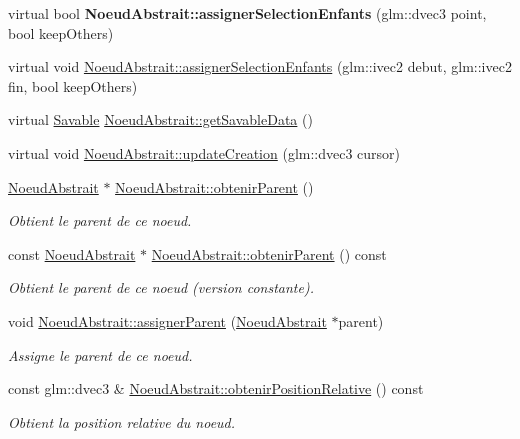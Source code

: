 \begin{DoxyCompactItemize}
\item 
\hypertarget{group__inf2990_ga4214cc2ab8bb23ab67c10387d7d1ef5e}{}virtual bool {\bfseries Noeud\+Abstrait\+::assigner\+Selection\+Enfants} (glm\+::dvec3 point, bool keep\+Others)\label{group__inf2990_ga4214cc2ab8bb23ab67c10387d7d1ef5e}

\item 
virtual void \hyperlink{group__inf2990_ga7304995555625461f49b1e75dd81e888}{Noeud\+Abstrait\+::assigner\+Selection\+Enfants} (glm\+::ivec2 debut, glm\+::ivec2 fin, bool keep\+Others)
\item 
virtual \hyperlink{class_savable}{Savable} \hyperlink{group__inf2990_ga1729231ec41b3ba4d6668eba101ead44}{Noeud\+Abstrait\+::get\+Savable\+Data} ()
\item 
virtual void \hyperlink{group__inf2990_ga233fd4600812176c557bb94ea04da5c9}{Noeud\+Abstrait\+::update\+Creation} (glm\+::dvec3 cursor)
\item 
\hyperlink{class_noeud_abstrait}{Noeud\+Abstrait} $\ast$ \hyperlink{group__inf2990_gaa2ac8c4cd02d88c312b92c65e07ed6d9}{Noeud\+Abstrait\+::obtenir\+Parent} ()
\begin{DoxyCompactList}\small\item\em Obtient le parent de ce noeud. \end{DoxyCompactList}\item 
const \hyperlink{class_noeud_abstrait}{Noeud\+Abstrait} $\ast$ \hyperlink{group__inf2990_gaf063d208bc4764b1fd2c4e76ec0469b9}{Noeud\+Abstrait\+::obtenir\+Parent} () const 
\begin{DoxyCompactList}\small\item\em Obtient le parent de ce noeud (version constante). \end{DoxyCompactList}\item 
void \hyperlink{group__inf2990_ga7787ab59ecc1e6119287459a7154f307}{Noeud\+Abstrait\+::assigner\+Parent} (\hyperlink{class_noeud_abstrait}{Noeud\+Abstrait} $\ast$parent)
\begin{DoxyCompactList}\small\item\em Assigne le parent de ce noeud. \end{DoxyCompactList}\item 
const glm\+::dvec3 \& \hyperlink{group__inf2990_ga62d73f67c3b33e2cb106630bd1736a58}{Noeud\+Abstrait\+::obtenir\+Position\+Relative} () const 
\begin{DoxyCompactList}\small\item\em Obtient la position relative du noeud. \end{DoxyCompactList}\item 

\end{DoxyCompactItemize}
